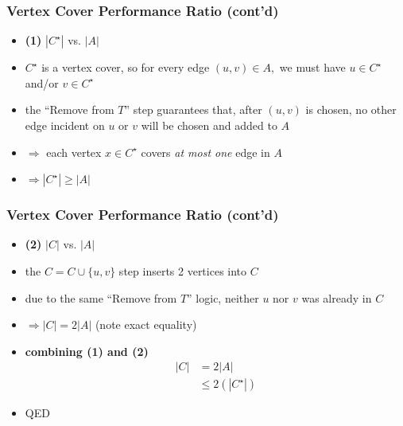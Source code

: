 \documentclass{beamer}
\begin{document}
\begin{frame} \frametitle{Vertex Cover Performance Ratio (cont'd)}
\begin{itemize}
  \item \textbf{(1)} $|C^\star|$ vs. $|A|$
  \item $C^\star$ is a vertex cover, so for every edge $(u, v) \in A,$ we must have
    $u \in C^\star$ and/or $v \in C^\star$
  \item the ``Remove from $T$'' step guarantees that, after $(u, v)$ is chosen,
    no other edge incident on $u$ or $v$ will be chosen and added to $A$
  \item $\Rightarrow$ each vertex $x \in C^\star$ covers \emph{at most one} edge in $A$
  \item $\Rightarrow |C^\star| \geq |A|$
\end{itemize}
\end{frame}

\begin{frame} \frametitle{Vertex Cover Performance Ratio (cont'd)}
\begin{itemize}
  \item \textbf{(2)} $|C|$ vs. $|A|$
  \item the $C = C \cup \{u, v \}$ step inserts 2 vertices into $C$
  \item  due to the same ``Remove from $T$'' logic, neither $u$ nor $v$ was already
    in $C$
  \item $\Rightarrow |C| = 2|A|$ (note exact equality)
  \item \textbf{combining (1) and (2)}
  \begin{align*}
    |C| &= 2|A| \\
    & \leq 2(|C^\star|)
  \end{align*}
  \item QED
\end{itemize}
\end{frame}
\end{document}
